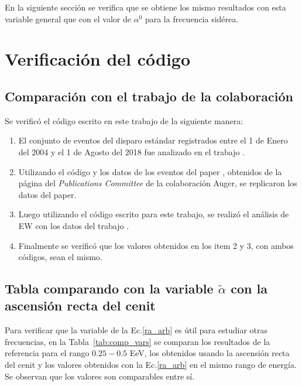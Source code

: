 En la siguiente sección se verifica que se obtiene los mismo resultados con esta variable general que con el valor de $\alpha^0$ para la frecuencia sidérea.

\section{Verificación del código}

\subsection{Comparación con el trabajo \cite{Aab_2020} de la colaboración}
Se verificó el código escrito en este trabajo de la siguiente manera:

\begin{enumerate}
    \item El conjunto de eventos del disparo estándar registrados entre el 1 de Enero del 2004 y el 1 de Agosto del 2018 fue analizado en el trabajo \cite{Aab_2020}.
    \item Utilizando el código y los datos de los eventos del paper \cite{Aab_2020}, obtenidos de la página del \emph{Publications Committee} de la colaboración Auger, se replicaron los datos del paper. 
    \item Luego utilizando el código escrito para este trabajo, se realizó el análisis de EW con los datos del trabajo \cite{Aab_2020}. 
    \item Finalmente se verificó que los valores obtenidos en los item 2 y 3, con  ambos códigos, sean el mismo.
\end{enumerate}

\subsection{Tabla comparando con la variable $\tilde{\alpha}$ con la ascensión recta del cenit }

Para verificar que la variable de la Ec.\ref{ra_arb} es útil para estudiar otras frecuencias, en la Tabla~\ref{tab:comp_vars} se comparan los resultados de la referencia para el rango $0.25-0.5$ EeV, los obtenidos usando la ascensión recta del cenit y los valores obtenidos con la Ec.\ref{ra_arb} en el mismo rango de energía. Se observan que los valores son comparables entre sí.

